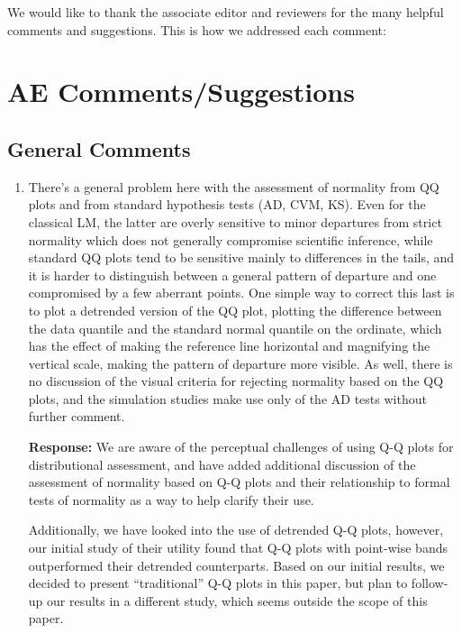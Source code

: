 \documentclass[11pt]{article}
\begin{document}
We would like to thank the associate editor and reviewers for the many helpful comments and suggestions. 
This is how we addressed each comment:

\section*{AE Comments/Suggestions}

\subsection*{General Comments}

\begin{enumerate}
\item There's a general problem here with the assessment of normality from QQ plots and from standard hypothesis tests (AD, CVM, KS). Even for the classical LM, the latter are overly sensitive to minor departures from strict normality which does not generally compromise scientific inference, while standard QQ plots tend to be sensitive mainly to differences in the tails, and it is harder to distinguish between a general pattern of departure and one compromised by a few aberrant points. One simple way to correct this last is to plot a detrended version of the QQ plot, plotting the difference between the data quantile and the standard normal quantile on the ordinate, which has the effect
of making the reference line horizontal and magnifying the vertical scale, making the pattern of departure more visible. As well, there is no discussion of the visual criteria for rejecting normality based on the QQ plots, and the simulation studies make use only of the AD tests without further comment.

\textbf{Response:} We are aware of the perceptual challenges of using Q-Q plots for distributional assessment, and have added additional discussion of the assessment of normality based on Q-Q plots and their relationship to formal tests of normality as a way to help clarify their use. 

Additionally, we have looked into the use of detrended Q-Q plots, however, our initial study of their utility found that Q-Q plots with point-wise bands outperformed their detrended counterparts. Based on our initial results, we decided to present ``traditional'' Q-Q plots in this paper, but plan to follow-up our results in a different study, which seems outside the scope of this paper.


\end{enumerate}
\end{document}
